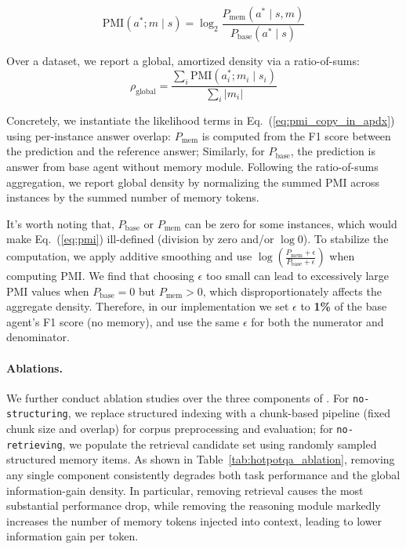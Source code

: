 \begin{equation}
\label{eq:pmi_copy_in_apdx}
\mathrm{PMI}(a^{*}; m \mid s)=\log_{2}\frac{P_{\text{mem}}(a^{*}\mid s,m)}{P_{\text{base}}(a^{*}\mid s)} 
\end{equation}

Over a dataset, we report a global, amortized density via a ratio-of-sums:
\begin{equation}
\label{eq:density_global_copy_in_apdx}
\rho_{\text{global}}=\frac{\sum_{i}\mathrm{PMI}(a^{*}_{i}; m_{i}\mid s_{i})}{\sum_{i}|m_{i}|} %
\end{equation}


Concretely, we instantiate the likelihood terms in Eq.~(\ref{eq:pmi_copy_in_apdx}) using per-instance answer overlap: $P_{\text{mem}}$ is computed from the F1 score between the prediction and the reference answer; Similarly, for $P_{\text{base}}$, the prediction is answer from base agent without memory module. Following the ratio-of-sums aggregation, we report global density by normalizing the summed PMI across instances by the summed number of memory tokens. 



It's worth noting that, $P_{\text{base}}$ or $P_{\text{mem}}$ can be zero for some instances, which would make Eq.~(\ref{eq:pmi}) ill-defined (division by zero and/or $\log 0$).
To stabilize the computation, we apply additive smoothing and use
$\log\!\left(\frac{P_{\text{mem}}+\epsilon}{P_{\text{base}}+\epsilon}\right)$
when computing PMI.
We find that choosing $\epsilon$ too small can lead to excessively large PMI values when $P_{\text{base}}=0$ but $P_{\text{mem}}>0$, which disproportionately affects the aggregate density.
Therefore, in our implementation we set $\epsilon$ to \textbf{1\%} of the base agent's F1 score (no memory), and use the same $\epsilon$ for both the numerator and denominator.


\paragraph{Ablations. } 
We further conduct ablation studies over the three components of \plugmem. For \texttt{no-structuring}, we replace structured indexing with a chunk-based pipeline (fixed chunk size and overlap) for corpus preprocessing and evaluation; for \texttt{no-retrieving}, we populate the retrieval candidate set using randomly sampled structured memory items. As shown in Table~\ref{tab:hotpotqa_ablation}, removing any single component consistently degrades both task performance and the global information-gain density. In particular, removing retrieval causes the most substantial performance drop, while removing the reasoning module markedly increases the number of memory tokens injected into context, leading to lower information gain per token.



